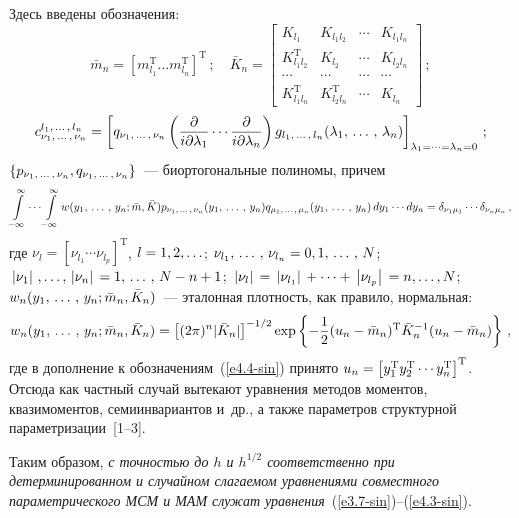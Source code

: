     \noindent
Здесь введены обозначения:
\begin{equation}
\bar m_n = \left[m_{l_1}^{\mathrm{T}} \ldots m_{l_n}^{\mathrm{T}}\right]^{\mathrm{T}}\,; \quad
    \bar K_n =\begin{bmatrix}
    K_{l_1}&K_{l_1l_2}&\cdots&K_{l_1l_n}\\
    K_{l_1l_2}^{\mathrm{T}}&K_{l_2}&\cdots&K_{l_2l_n}\\
    \cdots&\cdots&\cdots&\cdots\\
    K_{l_1l_n}^{\mathrm{T}}&K_{l_2l_n}^{\mathrm{T}}&\cdots&K_{l_n}\end{bmatrix}\,;\label{e4.4-sin}
    \end{equation}
            \begin{equation*}
    c_{\nu_1\tr \nu_n}^{l_1\tr l_n}=\lk q_{\nu_1\tr \nu_n} \left(
\fr{\partial}{i\partial \la_1} \cdots \fr{\partial}{i\partial
    \la_n}\right) g_{l_1\tr l_n}(\la_1\tr \la_n)\rk_{\la_1
    =\cdots=\la_n=0}\,; %
    \end{equation*}
$\{ p_{\nu_1,\,\ldots\,,\, \nu_n}, q_{\nu_1,\,\ldots\,,\, \nu_n}\}$~--- биортогональные полиномы, причем
    \begin{equation*}
\iii_{-\infty}^\infty \cdots \iii_{-\infty}^\infty w (y_1 \tr y_n;
    \bar m,\bar K) p_{\nu_1\tr \nu_n} (y_1\tr y_n)
     q_{\mu_1\tr \mu_n} (y_1\tr y_n)
    \,dy_1 \cdots dy_n = \delta_{\nu_1\mu_1} \cdots \delta_{\nu_n\mu_n}\,, %
    \end{equation*}
где $\nu_l =[\nu_{l_1} \cdots \nu_{l_p} ]^{\mathrm{T}}$,
$l\hm=1,2,\ldots$; $\nu_{l_1}\tr \nu_{l_n} \hm=0,1\tr N$;
$\lv \nu_1\rv,\ldots,\lv\nu_n\rv \hm= 1\tr N\hm-n\hm+1$; $\lv \nu_l \rv\hm=
 \lv \nu_{l_1} \rv+\cdots + \lv \nu_{l_p} \rv=n,
\ldots,N$; $w_n (y_1,\,\ldots\,,\, y_n; \bar m_n, \bar K_n)$~---  эталонная плотность, как правило, нормальная:
\begin{equation*}
w_n (y_1\tr y_n; \bar m_n, \bar K_n)= \lk (2\pi)^n |\bar K_n|\rk^{-1/2}
 \exp 
\lf -\fr{1}{2} (u_n -\bar m_n)^{\mathrm{T}} \bar K_n^{-1} (u_n - \bar m_n)\rf\,, %
\end{equation*}
где в дополнение к обозначениям~(\ref{e4.4-sin})  принято 
$u_n\hm= \lk y_1^{\mathrm{T}} y_2^{\mathrm{T}}\cdots y_n^{\mathrm{T}}\rk^{\mathrm{T}}$. 
Отсюда как частный случай вытекают уравнения методов моментов, квазимоментов, семиинвариантов и~др., 
а также параметров структурной параметризации~[1--3].

Таким образом, {\it с точностью до $h$ и $h^{1/2}$ соответственно при детерминированном и случайном 
слагаемом уравнениями совместного параметрического МСМ и МАМ служат уравнения\/}~(\ref{e3.7-sin})--(\ref{e4.3-sin}).

